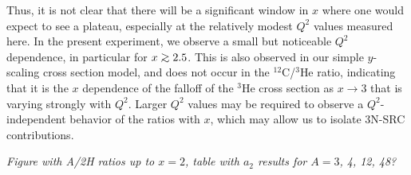 Thus, it is not clear that there will be a significant window in $x$ where one would expect to see a plateau, especially at the relatively modest
$Q^2$ values measured here. In the present experiment, we observe a small but noticeable $Q^2$ dependence, in particular for $x \gtorder 2.5$. This
is also observed in our simple $y$-scaling cross section model, and does not occur in the $^{12}$C/$^3$He ratio, indicating that it is the $x$
dependence of the falloff of the $^3$He cross section as $x \to 3$ that is varying strongly with $Q^2$. Larger $Q^2$ values may be required to
observe a $Q^2$-independent behavior of the ratios with $x$, which may allow us to isolate 3N-SRC contributions.



\textit{Figure with A/2H ratios up to $x=2$, table with $a_2$ results for $A=3$, 4, 12, 48?}


